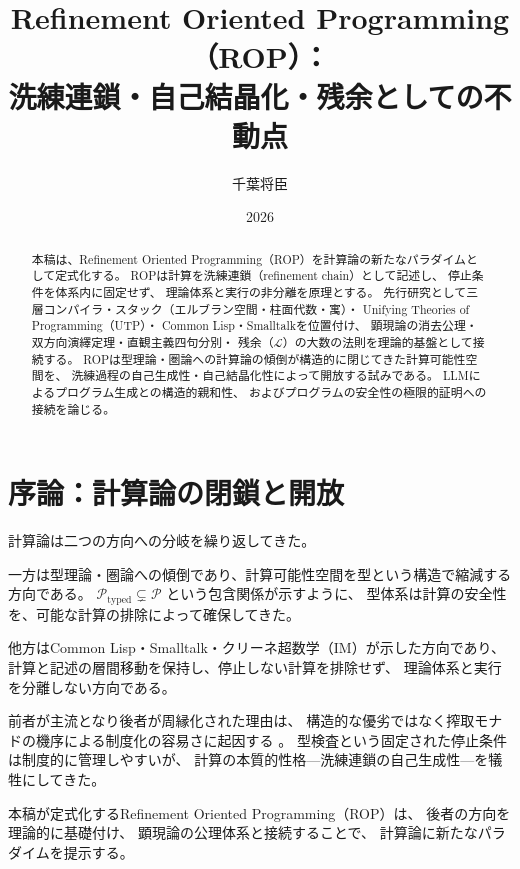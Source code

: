 \documentclass[11pt,a4paper]{ltjsarticle}
\theoremstyle{definition}
\newcommand{\Lhagma}{\mathcal{L}}
\begin{document}
\title{Refinement Oriented Programming（ROP）：\\
洗練連鎖・自己結晶化・残余としての不動点}
\author{千葉将臣}
\date{2026}

\maketitle

\begin{abstract}
本稿は、Refinement Oriented Programming（ROP）を計算論の新たなパラダイムとして定式化する。
ROPは計算を洗練連鎖（refinement chain）として記述し、
停止条件を体系内に固定せず、
理論体系と実行の非分離を原理とする。
先行研究として三層コンパイラ・スタック（エルブラン空間・柱面代数・寓）・
Unifying Theories of Programming（UTP）・
Common Lisp・Smalltalkを位置付け、
顕現論の消去公理・双方向演繹定理・直観主義四句分別・
残余（$\Lhagma$）の大数の法則を理論的基盤として接続する。
ROPは型理論・圏論への計算論の傾倒が構造的に閉じてきた計算可能性空間を、
洗練過程の自己生成性・自己結晶化性によって開放する試みである。
LLMによるプログラム生成との構造的親和性、
およびプログラムの安全性の極限的証明への接続を論じる。
\end{abstract}

\tableofcontents
\newpage

\section{序論：計算論の閉鎖と開放}

計算論は二つの方向への分岐を繰り返してきた。

一方は型理論・圏論への傾倒であり、計算可能性空間を型という構造で縮減する方向である。
$\mathcal{P}_{\text{typed}} \subsetneq \mathcal{P}$ という包含関係が示すように、
型体系は計算の安全性を、可能な計算の排除によって確保してきた。

他方はCommon Lisp・Smalltalk・クリーネ超数学（IM）が示した方向であり、
計算と記述の層間移動を保持し、停止しない計算を排除せず、
理論体系と実行を分離しない方向である。

前者が主流となり後者が周縁化された理由は、
構造的な優劣ではなく搾取モナドの機序による制度化の容易さに起因する
\cite{Chiba2026_monad}。
型検査という固定された停止条件は制度的に管理しやすいが、
計算の本質的性格---洗練連鎖の自己生成性---を犠牲にしてきた。

本稿が定式化するRefinement Oriented Programming（ROP）は、
後者の方向を理論的に基礎付け、
顕現論の公理体系\cite{Chiba2026_chikaku}と接続することで、
計算論に新たなパラダイムを提示する。
\end{document}
